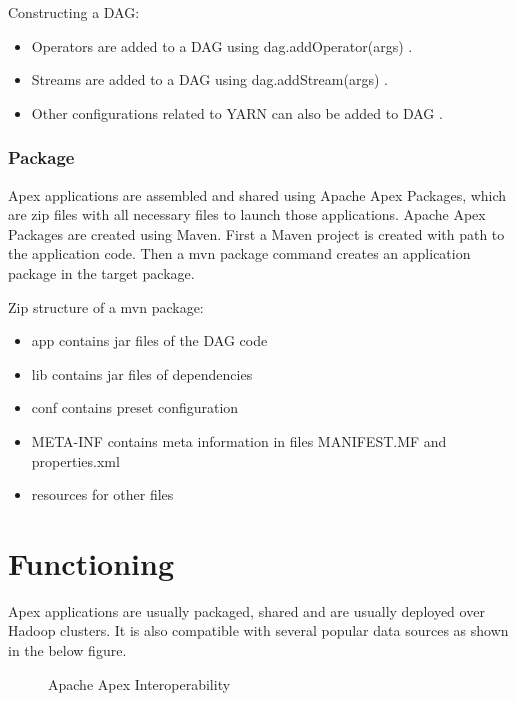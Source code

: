 \documentclass[9pt,twocolumn,twoside]{../../styles/osajnl}
\begin{document}
Constructing a DAG:
\begin{itemize}
  \item Operators are added to a DAG using dag.addOperator(args) \cite{ww-apacheapexinslideshare}.
  \item Streams are added to a DAG using dag.addStream(args) \cite{ww-apacheapexinslideshare}.
  \item Other configurations related to YARN can also be added to DAG \cite{ww-apacheapexinslideshare}. 
  
\end{itemize}
\subsubsection{Package}
Apex applications are assembled and shared using Apache Apex Packages, which are zip files with all necessary files to launch those applications.
Apache Apex Packages are created using Maven.                 
First a Maven project is created with path to the application code. 
Then a mvn package command creates an application package in the target package.


Zip structure of a mvn package:
\begin{itemize}
  \item app contains jar files of the DAG code
  \item lib contains jar files of dependencies
  \item conf contains preset configuration
  \item  META-INF contains meta information in files MANIFEST.MF and properties.xml
   \item resources for other files
\end{itemize}


\section{Functioning}
Apex applications are usually packaged, shared and are usually deployed over Hadoop clusters. It is also compatible with several popular data sources as shown in the below figure.
\begin{figure}[ht!]
\centering
{}
\caption{Apache Apex Interoperability\cite{www-apacheapexblog}}
\label{fig:Apache Apex Interoperability}
\end{figure}
\end{document}
